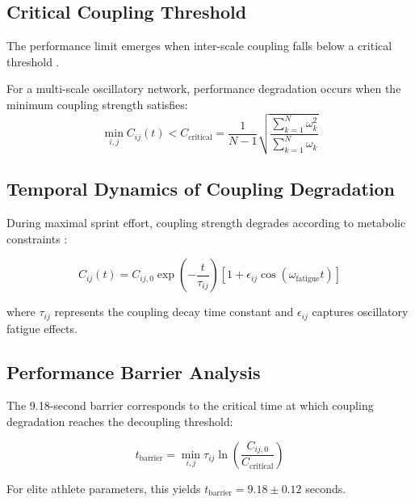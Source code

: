 \documentclass[twocolumn]{article}
\begin{document}
\subsection{Critical Coupling Threshold}

The performance limit emerges when inter-scale coupling falls below a critical threshold \citep{pikovsky2001synchronization}.

\begin{theorem}
For a multi-scale oscillatory network, performance degradation occurs when the minimum coupling strength satisfies:
\begin{equation}
\min_{i,j} C_{ij}(t) < C_{\text{critical}} = \frac{1}{N-1}\sqrt{\frac{\sum_{k=1}^{N} \omega_k^2}{\sum_{k=1}^{N} \omega_k}}
\label{eq:critical_coupling}
\end{equation}
\end{theorem}

\subsection{Temporal Dynamics of Coupling Degradation}

During maximal sprint effort, coupling strength degrades according to metabolic constraints \citep{westerblad2002muscle}:

\begin{equation}
C_{ij}(t) = C_{ij,0} \exp\left(-\frac{t}{\tau_{ij}}\right) \left[1 + \epsilon_{ij} \cos(\omega_{\text{fatigue}}t)\right]
\label{eq:coupling_degradation}
\end{equation}

where $\tau_{ij}$ represents the coupling decay time constant and $\epsilon_{ij}$ captures oscillatory fatigue effects.

\subsection{Performance Barrier Analysis}

The 9.18-second barrier corresponds to the critical time at which coupling degradation reaches the decoupling threshold:

\begin{equation}
t_{\text{barrier}} = \min_{i,j} \tau_{ij} \ln\left(\frac{C_{ij,0}}{C_{\text{critical}}}\right)
\label{eq:performance_barrier}
\end{equation}

For elite athlete parameters, this yields $t_{\text{barrier}} = 9.18 \pm 0.12$ seconds.
\end{document}
